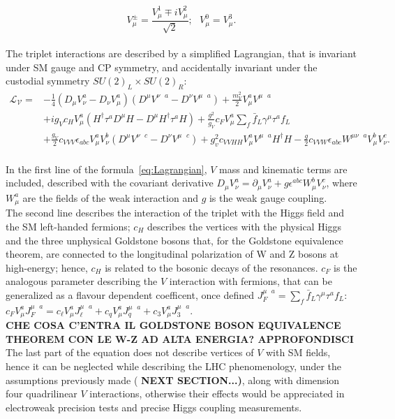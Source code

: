 \begin{equation}
V_{\mu}^{\pm} = \frac{V_{\mu}^1 \mp i V_{\mu}^2}{\sqrt{2}}; \mbox{ } V_{\mu}^0 = V_{\mu}^3.
\label{eq:V_triplet}
\end{equation}
\\
The triplet interactions are described by a simplified Lagrangian, that is invariant under SM gauge and CP symmetry, and accidentally invariant under the custodial symmetry $SU(2)_L \times SU(2)_R$:
\begin{equation}
\begin{split}
\mathcal{L_V} ={} & -\frac{1}{4} \left(D_{\mu}V_{\nu}^a - D_{\nu}V_{\mu}^a \right) \left( D^{\mu}V^{\nu \mbox{ } a} - D^{\nu}V^{\mu \mbox{ } a} \right) + \frac{m_V^2}{2}V_{\mu}^aV^{\mu \mbox{ } a} \\
 & +i g_V c_H V_{\mu}^a \left( H^{\dagger} \tau^a D^{\mu}H - D^{\mu}H^{\dagger} \tau^a H \right) + \frac{g^2}{g_V}c_F V_{\mu}^a \sum_{f} \bar{f}_L \gamma^{\mu} \tau^a f_L \\
 & + \frac{g_V}{2} c_{VVV} \epsilon_{abc} V_{\mu}^a V_{\nu}^b \left( D^{\mu}V^{\nu \mbox{ } c} - D^{\nu}V^{\mu \mbox{ } c}\right) + g_v^2 c_{VVHH} V_{\mu}^a V^{\mu \mbox{ } a} H^{\dagger} H - \frac{g}{2} c_{VVW} \epsilon_{abc} W^{\mu \nu \mbox{ } a} V_{\mu}^b V_{\nu}^c.
\end{split}
\label{eq:Lagrangian}
\end{equation}
\\
In the first line of the formula~\ref{eq:Lagrangian}, $V$ mass and kinematic terms are included, described with the covariant derivative $D_{\mu} V_{\nu}^a = \partial_{\mu} V_{\nu}^a + g \epsilon^{abc} W_{\mu}^b V_{\nu}^c$, where $W_{\mu}^a$ are the fields of the weak interaction and $g$ is the weak gauge coupling.\\
The second line describes the interaction of the triplet with the Higgs field and the SM left-handed fermions; $c_H$ describes the vertices with the physical Higgs and the three unphysical Goldstone bosons that, for the Goldstone equivalence theorem, are connected to the longitudinal polarization of W and Z bosons at high-energy; hence, $c_H$ is related to the bosonic decays of the resonances. $c_F$ is the analogous parameter describing the $V$ interaction with fermions, that can be generalized as a flavour dependent coefficent, once defined $J_F^{\mu \mbox{ } a} = \sum_{f} \bar{f}_L \gamma^{\mu} \tau^a f_L$: $c_F V_{\mu}^a  J_F^{\mu \mbox{ } a} = c_{\ell} V_{\mu}^a  J_{\ell}^{\mu \mbox{ } a} + c_{q} V_{\mu}^a  J_{q}^{\mu \mbox{ } a} + c_{3} V_{\mu}^a  J_{3}^{\mu \mbox{ } a}$.\\
{\color{red} \bf CHE COSA C'ENTRA IL GOLDSTONE BOSON EQUIVALENCE THEOREM CON LE W-Z AD ALTA ENERGIA? APPROFONDISCI\\}
The last part of the equation does not describe vertices of $V$ with SM fields, hence it can be neglected while describing the LHC phenomenology, under the assumptions previously made {(\color{red} \bf NEXT SECTION...)}, along with dimension four quadrilinear $V$ interactions, otherwise their effects would be appreciated in electroweak precision tests and precise Higgs coupling measurements.\\

